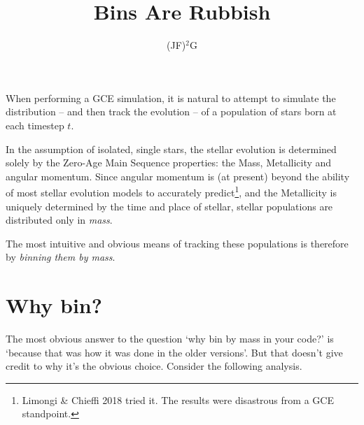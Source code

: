 \documentclass[a4paper,11pt]{article}
\title{Bins Are Rubbish}
\author{(JF)$^2$G}
\begin{document}
	\setcounter{tocdepth}{2}
	\maketitle

	When performing a GCE simulation, it is natural to attempt to simulate the distribution -- and then track the evolution -- of a population of stars born at each timestep $t$. 

	In the assumption of isolated, single stars, the stellar evolution is determined solely by the Zero-Age Main Sequence properties: the Mass, Metallicity and angular momentum. Since angular momentum is (at present) beyond the ability of most stellar evolution models to accurately predict\footnote{Limongi \& Chieffi 2018 tried it. The results were disastrous from a GCE standpoint.}, and the Metallicity is uniquely determined by the time and place of stellar, stellar populations are distributed only in \textit{mass}.

	The most intuitive and obvious means of tracking these populations is therefore by \textit{binning them by mass}.
	
	\section{Why bin?}

		The most obvious answer to the question `why bin by mass in your code?' is `because that was how it was done in the older versions'. But that doesn't give credit to why it's the obvious choice. Consider the following analysis.

\end{document}
